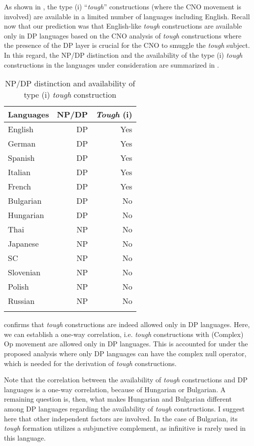 \documentclass[output=paper]{langscibook}
\begin{document}
As shown in , the type (i) “\textit{tough}” constructions (where the CNO movement is involved) are available in a limited number of languages including English. Recall now that our prediction was that English-like \textit{tough} constructions are available only in DP languages based on the CNO analysis of \textit{tough} constructions where the presence of the DP layer is crucial for the CNO to smuggle the \textit{tough} subject. In this regard, the NP/DP distinction and the availability of the type (i) \textit{tough} constructions in the languages under consideration are summarized in . 

\begin{table}
\caption{NP/DP distinction and availability of type (i) \emph{tough} construction}
\label{tab:2:npdp}
 \begin{tabular}{l rr}
  \lsptoprule
     {Languages}  & {NP/DP} & {\textit{Tough} (i)}\\
  \midrule
  English  &   DP  &    Yes  \\
  German  &   DP &   Yes  \\
    Spanish  &   DP &   Yes  \\
    Italian  &   DP &   Yes  \\
    French  &   DP &   Yes  \\
    Bulgarian  &   DP &   No  \\
    Hungarian  &   DP &   No  \\
    Thai  &   NP &   No  \\
    Japanese  &   NP &   No  \\
    SC  &   NP &   No  \\
    Slovenian  &   NP &   No  \\
    Polish  &   NP &   No  \\
    Russian  &   NP &   No  \\
  \lspbottomrule
 \end{tabular}
\end{table}

 confirms that \textit{tough} constructions are indeed allowed only in DP languages. Here, we can establish a one-way correlation, i.e. \textit{tough} constructions with (Complex) Op movement are allowed only in DP languages. This is accounted for under the proposed analysis where only DP languages can have the complex null operator, which is needed for the derivation of \textit{tough} constructions.

Note that the correlation between the availability of \textit{tough} constructions and DP languages is a one-way correlation, because of Hungarian or Bulgarian. A remaining question is, then, what makes Hungarian and Bulgarian different among DP languages regarding the availability of \textit{tough} constructions. I suggest here that other independent factors are involved. In the case of Bulgarian, its \textit{tough} formation utilizes a subjunctive complement, as infinitive is rarely used in this language. 
\end{document}
